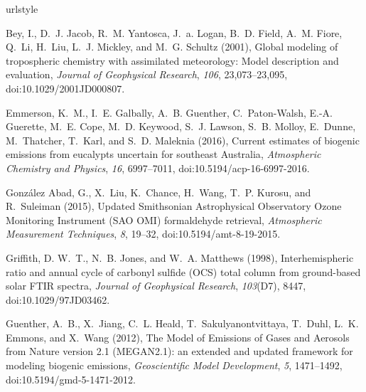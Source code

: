 \documentclass[draft]{agujournal}
\begin{document}
\begin{thebibliography}{19}
\providecommand{\natexlab}[1]{#1}
\expandafter\ifx\csname urlstyle\endcsname\relax
  \providecommand{\doi}[1]{doi:\discretionary{}{}{}#1}\else
  \providecommand{\doi}{doi:\discretionary{}{}{}\begingroup
  \urlstyle{rm}\Url}\fi

Bey, I., D.~J. Jacob, R.~M. Yantosca, J.~a. Logan, B.~D. Field, A.~M. Fiore,
  Q.~Li, H.~Liu, L.~J. Mickley, and M.~G. Schultz (2001), {Global modeling of
  tropospheric chemistry with assimilated meteorology: Model description and
  evaluation}, \textit{Journal of Geophysical Research}, \textit{106},
  23,073--23,095, \doi{10.1029/2001JD000807}.

Emmerson, K.~M., I.~E. Galbally, A.~B. Guenther, C.~Paton-Walsh, E.-A.
  Guerette, M.~E. Cope, M.~D. Keywood, S.~J. Lawson, S.~B. Molloy, E.~Dunne,
  M.~Thatcher, T.~Karl, and S.~D. Maleknia (2016), {Current estimates of
  biogenic emissions from eucalypts uncertain for southeast Australia},
  \textit{Atmospheric Chemistry and Physics}, \textit{16}, 6997--7011,
  \doi{10.5194/acp-16-6997-2016}.

{Gonz{\'{a}}lez Abad}, G., X.~Liu, K.~Chance, H.~Wang, T.~P. Kurosu, and
  R.~Suleiman (2015), {Updated Smithsonian Astrophysical Observatory Ozone
  Monitoring Instrument (SAO OMI) formaldehyde retrieval}, \textit{Atmospheric
  Measurement Techniques}, \textit{8}, 19--32, \doi{10.5194/amt-8-19-2015}.

Griffith, D. W.~T., N.~B. Jones, and W.~A. Matthews (1998), {Interhemispheric
  ratio and annual cycle of carbonyl sulfide (OCS) total column from
  ground-based solar FTIR spectra}, \textit{Journal of Geophysical Research},
  \textit{103}(D7), 8447, \doi{10.1029/97JD03462}.

Guenther, A.~B., X.~Jiang, C.~L. Heald, T.~Sakulyanontvittaya, T.~Duhl, L.~K.
  Emmons, and X.~Wang (2012), {The Model of Emissions of Gases and Aerosols
  from Nature version 2.1 (MEGAN2.1): an extended and updated framework for
  modeling biogenic emissions}, \textit{Geoscientific Model Development},
  \textit{5}, 1471--1492, \doi{10.5194/gmd-5-1471-2012}.


\end{thebibliography}
\end{document}

